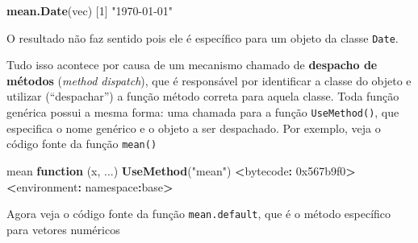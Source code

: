 \documentclass[10pt,a4paper]{book}
\newenvironment{Shaded}{\begin{snugshade}}{\end{snugshade}}
\newcommand{\KeywordTok}[1]{\textcolor[rgb]{0.13,0.29,0.53}{\textbf{#1}}}
\newcommand{\DecValTok}[1]{\textcolor[rgb]{0.00,0.00,0.81}{#1}}
\newcommand{\StringTok}[1]{\textcolor[rgb]{0.31,0.60,0.02}{#1}}
\newcommand{\ControlFlowTok}[1]{\textcolor[rgb]{0.13,0.29,0.53}{\textbf{#1}}}
\newcommand{\OperatorTok}[1]{\textcolor[rgb]{0.81,0.36,0.00}{\textbf{#1}}}
\newcommand{\ErrorTok}[1]{\textcolor[rgb]{0.64,0.00,0.00}{\textbf{#1}}}
\newcommand{\NormalTok}[1]{#1}
\begin{document}
\begin{Shaded}
\begin{Highlighting}[]
\KeywordTok{mean.Date}\NormalTok{(vec)}
\NormalTok{[}\DecValTok{1}\NormalTok{] }\StringTok{"1970-01-01"}
\end{Highlighting}
\end{Shaded}

O resultado não faz sentido pois ele é específico para um objeto da
classe \texttt{Date}.

Tudo isso acontece por causa de um mecanismo chamado de \textbf{despacho
de métodos} (\emph{method dispatch}), que é responsável por identificar
a classe do objeto e utilizar (``despachar'') a função método correta
para aquela classe. Toda função genérica possui a mesma forma: uma
chamada para a função \texttt{UseMethod()}, que especifica o nome
genérico e o objeto a ser despachado. Por exemplo, veja o código fonte
da função \texttt{mean()}

\begin{Shaded}
\begin{Highlighting}[]
\NormalTok{mean}
\ControlFlowTok{function}\NormalTok{ (x, ...) }
\KeywordTok{UseMethod}\NormalTok{(}\StringTok{"mean"}\NormalTok{)}
\OperatorTok{<}\NormalTok{bytecode}\OperatorTok{:}\StringTok{ }\DecValTok{0x567b9f0}\OperatorTok{>}
\ErrorTok{<}\NormalTok{environment}\OperatorTok{:}\StringTok{ }\NormalTok{namespace}\OperatorTok{:}\NormalTok{base}\OperatorTok{>}
\end{Highlighting}
\end{Shaded}

Agora veja o código fonte da função \texttt{mean.default}, que é o
método específico para vetores numéricos
\end{document}
